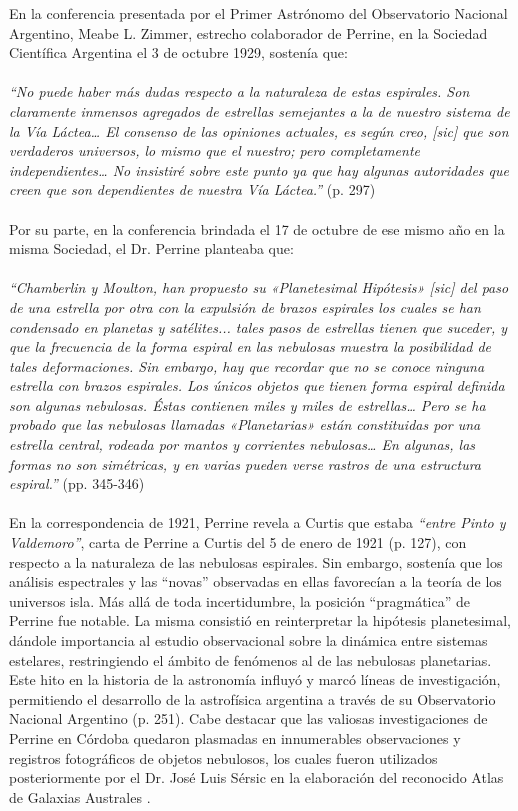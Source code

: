 \documentclass[baaa]{baaa}
\begin{document}
En la conferencia presentada por el Primer Astrónomo del Observatorio Nacional Argentino, Meabe L. Zimmer, estrecho colaborador de Perrine, en la Sociedad Científica Argentina el 3 de octubre 1929, sostenía que:
\\
\\
\textit{“No puede haber más dudas respecto a la naturaleza de estas espirales. Son claramente inmensos agregados de estrellas semejantes a la de nuestro sistema de la Vía Láctea… El consenso de las opiniones actuales, es según creo, [sic] que son verdaderos universos, lo mismo que el nuestro; pero completamente independientes… No insistiré sobre este punto ya que hay algunas autoridades que creen que son dependientes de nuestra Vía Láctea.”} \citep{Zimmer1931} (p. 297)
\\
\\
Por su parte, en la conferencia brindada el 17 de octubre de ese mismo año en la misma Sociedad, el Dr. Perrine planteaba que: 
\\
\\
\textit{“Chamberlin y Moulton, han propuesto su «Planetesimal Hipótesis» [sic] del paso de una estrella por otra con la expulsión de brazos espirales los cuales se han condensado en planetas y satélites... tales pasos de estrellas tienen que suceder, y que la frecuencia de la forma espiral en las nebulosas muestra la posibilidad de tales deformaciones. Sin embargo, hay que recordar que no se conoce ninguna estrella con brazos espirales. Los únicos objetos que tienen forma espiral definida son algunas nebulosas. Éstas contienen miles y miles de estrellas… Pero se ha probado que las nebulosas llamadas «Planetarias» están constituidas por una estrella central, rodeada por mantos y corrientes nebulosas… En algunas, las formas no son simétricas, y en varias pueden verse rastros de una estructura espiral.”} \citep{Perrine1931} (pp. 345-346)
\\
\\
En la correspondencia de 1921, Perrine revela a Curtis que estaba \textit{“entre Pinto y Valdemoro”}, carta de Perrine a Curtis del 5 de enero de 1921 \citep{Smith1993} (p. 127), con respecto a la naturaleza de las nebulosas espirales. Sin embargo, sostenía que los análisis espectrales y las “novas” observadas en ellas favorecían a la teoría de los universos isla. Más allá de toda incertidumbre, la posición “pragmática” de Perrine fue notable. La misma consistió en reinterpretar la hipótesis planetesimal, dándole importancia al estudio observacional sobre la dinámica entre sistemas estelares, restringiendo el ámbito de fenómenos al de las nebulosas planetarias. Este hito en la historia de la astronomía influyó y marcó líneas de investigación, permitiendo el desarrollo de la astrofísica argentina a través de su Observatorio Nacional Argentino \citep{Paolantonio2022} (p. 251). Cabe destacar que las valiosas investigaciones de Perrine en Córdoba quedaron plasmadas en innumerables observaciones y registros fotográficos de objetos nebulosos, los cuales fueron utilizados posteriormente por el Dr. José Luis Sérsic en la elaboración del reconocido Atlas de Galaxias Australes \citep{1968adga.book.....S}.
\end{document}
